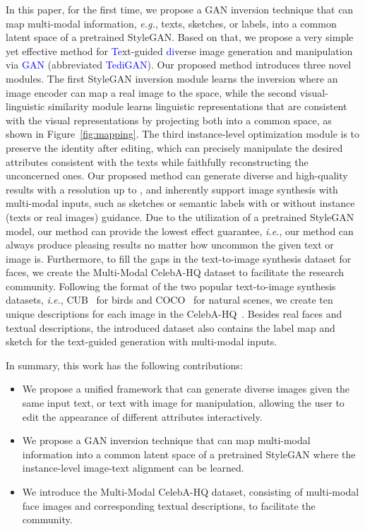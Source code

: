 \documentclass[final]{cvpr}
\def\eg{\emph{e.g.}}
\def\ie{\emph{i.e.}}
\begin{document}
In this paper, for the first time, we propose a GAN inversion technique that can map multi-modal information, \eg, texts, sketches, or labels, into a common latent space of a pretrained StyleGAN.
Based on that, we propose a very simple yet effective method for \textcolor{blue}{Te}xt-guided \textcolor{blue}{di}verse image generation and manipulation via \textcolor{blue}{GAN} (abbreviated \textcolor{blue}{TediGAN}). 
Our proposed method introduces three novel modules. The first StyleGAN inversion module learns the inversion where an image encoder can map a real image to the  space, 
while the second visual-linguistic similarity module learns linguistic representations that are consistent with the visual representations by projecting both into a common  space, as shown in Figure~\ref{fig:mapping}.
The third instance-level optimization module is to preserve the identity after editing, which can precisely manipulate the desired attributes consistent with the texts while faithfully reconstructing the unconcerned ones.
Our proposed method can generate diverse and high-quality results 
with a resolution up to ,
and inherently support image synthesis with multi-modal inputs, such as sketches or semantic labels with or without instance (texts or real images) guidance.
Due to the utilization of a pretrained StyleGAN model, our method can provide the lowest effect guarantee, \ie, our method can always produce pleasing results no matter how uncommon the given text or image is.
Furthermore, to fill the gaps in the text-to-image synthesis dataset for faces, we create the Multi-Modal CelebA-HQ dataset to facilitate the research community.
Following the format of the two popular text-to-image synthesis datasets, \ie, CUB~\cite{wah2011caltech} for birds and COCO~\cite{lin2014microsoft} for natural scenes, we create ten unique descriptions for each image in the CelebA-HQ~\cite{karras2017progressive}. 
Besides real faces and textual descriptions, the introduced dataset also contains the label map and sketch for the text-guided generation with multi-modal inputs.

In summary, this work has the following contributions:
\begin{itemize} 
\item 
We propose a unified framework that can generate diverse images given the same input text, or text with image for manipulation, allowing the user to edit the appearance of different attributes interactively.

\item We propose a GAN inversion technique that can map multi-modal information into a common latent space of a pretrained StyleGAN where the instance-level image-text alignment can be learned.
\item We introduce the Multi-Modal CelebA-HQ dataset, consisting of multi-modal face images and corresponding textual descriptions, to facilitate the community.
\end{itemize}
\end{document}
